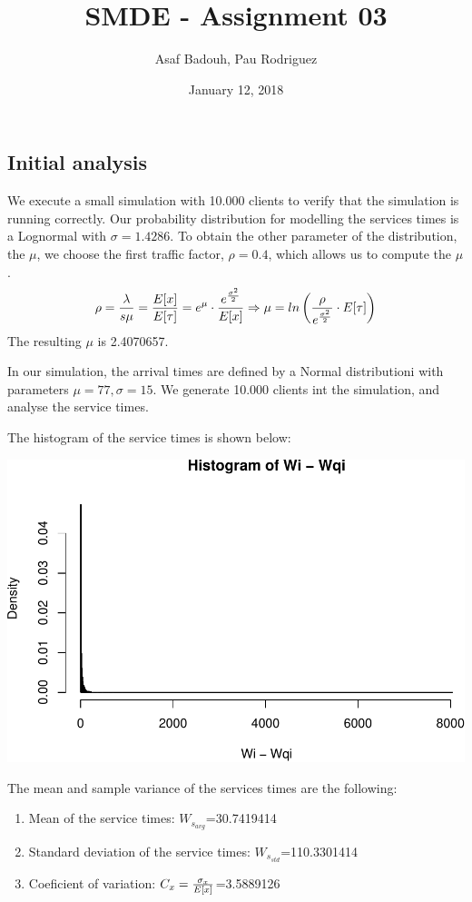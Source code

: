 \documentclass[]{article}
\title{SMDE - Assignment 03}
\author{Asaf Badouh, Pau Rodriguez}
\date{January 12, 2018}
\providecommand{\tightlist}{%
  \setlength{\itemsep}{0pt}\setlength{\parskip}{0pt}}
\begin{document}
\maketitle

\subsection{Initial analysis}\label{initial-analysis}

We execute a small simulation with 10.000 clients to verify that the
simulation is running correctly. Our probability distribution for
modelling the services times is a Lognormal with \(\sigma=1.4286\). To
obtain the other parameter of the distribution, the \(\mu\), we choose
the first traffic factor, \(\rho=0.4\), which allows us to compute the
\(\mu\).\\
\[  \rho = { \lambda \over {s\mu}} = { E[x] \over E[\tau] } = e^{\mu} \cdot { e^{\sigma^{2} \over 2} \over E[x] } \Rightarrow \mu = ln \left( { \rho \over e^{ \sigma^{2} \over 2 } } \cdot E[\tau]  \right) \]
The resulting \(\mu\) is 2.4070657.

In our simulation, the arrival times are defined by a Normal
distributioni with parameters \(\mu=77, \sigma=15\). We generate 10.000
clients int the simulation, and analyse the service times.

The histogram of the service times is shown below:

\begin{center}\includegraphics[width=0.5\linewidth]{003_files/figure-latex/unnamed-chunk-6-1} \end{center}

The mean and sample variance of the services times are the following:

\begin{enumerate}
\def\labelenumi{\arabic{enumi}.}
\tightlist
\item
  Mean of the service times: \(W_{s_{avg}}\)=30.7419414
\item
  Standard deviation of the service times: \(W_{s_{std}}\)=110.3301414
\item
  Coeficient of variation: \(C_{x}={ \sigma_{x} \over E[x] }\)=3.5889126
\end{enumerate}
\end{document}
